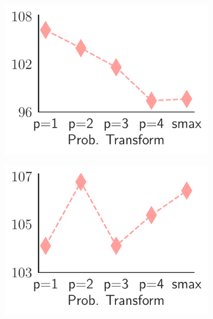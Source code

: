 \begin{figure}[tb]
\begin{subfigure}[b]{0.24\textwidth}
         \vspace{-6mm}
         \caption{\rewardmle}
         \label{fig:listmle_smax_num_traj}
     \end{subfigure}
     \hfill
    \begin{subfigure}[b]{0.24\textwidth}
         \centering
         \includegraphics[width=\textwidth]{./Tex/fig/listNet_3_line.pdf}
         \captionsetup{font=small}
         \vspace{-6mm}
         \caption{\rewardnet}
         \label{fig:listnet_3_transf}
     \end{subfigure}
     \hfill
     \begin{subfigure}[b]{0.24\textwidth}
         \centering
         \includegraphics[width=\textwidth]{./Tex/fig/ListMLE_5_line.pdf}

\end{subfigure}
\end{figure}
